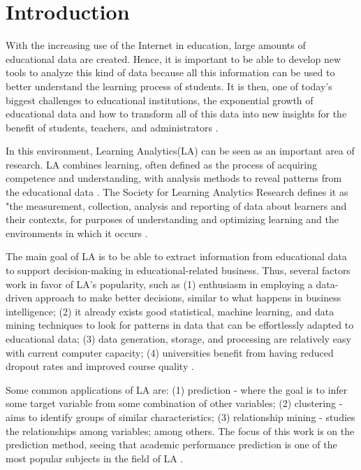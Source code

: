 \chapter{Introduction}
\label{ch:Introduction}

With the increasing use of the Internet in education, large amounts of educational data are created. Hence, it is important to be able to develop new tools to analyze this kind of data because all this information can be used to better understand the learning process of students. It is then, one of today's biggest challenges to educational institutions, the exponential growth of educational data and how to transform all of this data into new insights for the benefit of students, teachers, and administrators \cite{romero2020educational}.

In this environment, Learning Analytics(LA) can be seen as an important area of research. LA combines learning, often defined as the process of acquiring competence and understanding, with analysis methods to reveal patterns from the educational data \cite{khalil2015learning}. The Society for Learning Analytics Research defines it as "the measurement, collection, analysis and reporting of data about learners and their contexts, for purposes of understanding and optimizing learning and the environments in which it occurs \cite{solar11}.

The main goal of LA is to be able to extract information from educational data to support decision-making in educational-related business. Thus, several factors work in favor of LA's popularity, such as (1) enthusiasm in employing a data-driven approach to make better decisions, similar to what happens in business intelligence; (2) it already exists good statistical, machine learning, and data mining techniques to look for patterns in data that can be effortlessly adapted to educational data; (3) data generation, storage, and processing are relatively easy with current computer capacity; (4) universities benefit from having reduced dropout rates and improved course quality \cite{linan2015educational}. 

Some common applications of LA are: (1) prediction - where the goal is to infer some target variable from some combination of other variables; (2) clustering - aims to identify groups of similar characteristics; (3) relationship mining - studies the relationships among variables; among others. The focus of this work is on the prediction method, seeing that academic performance prediction is one of the most popular subjects in the field of LA \cite{akccapinar2019using}.

